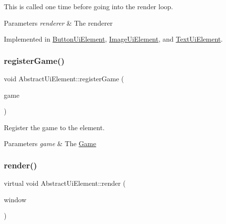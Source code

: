 This is called one time before going into the render loop. 


\begin{DoxyParams}{Parameters}
{\em renderer} & The renderer\\
\hline
\end{DoxyParams}


Implemented in \mbox{\hyperlink{class_button_ui_element_a035c8beddc1ff6d47b94953025f68422}{Button\+Ui\+Element}}, \mbox{\hyperlink{class_image_ui_element_a15c523c82400b74f2f5713c6510f8c7a}{Image\+Ui\+Element}}, and \mbox{\hyperlink{class_text_ui_element_afe15a4085bc4b7c2cf8668cb6d7fd45d}{Text\+Ui\+Element}}.

\mbox{\label{class_abstract_ui_element_aea8a32a77e77f601ca114b8738072079}} 
\subsubsection{\texorpdfstring{register\+Game()}{registerGame()}}
{\footnotesize\ttfamily void Abstract\+Ui\+Element\+::register\+Game (\begin{DoxyParamCaption}\item[{\mbox{\hyperlink{class_abstract_game}{Abstract\+Game}} $\ast$}]{game }\end{DoxyParamCaption})\hspace{0.3cm}{\ttfamily [virtual]}}



Register the game to the element. 


\begin{DoxyParams}{Parameters}
{\em game} & The \mbox{\hyperlink{class_game}{Game}}\\
\hline
\end{DoxyParams}
\mbox{\label{class_abstract_ui_element_aea66ce333323cf2d5e12d4de9515de7b}} 
\subsubsection{\texorpdfstring{render()}{render()}}
{\footnotesize\ttfamily virtual void Abstract\+Ui\+Element\+::render (\begin{DoxyParamCaption}\item[{\mbox{\hyperlink{class_window}{Window}} $\ast$}]{window }\end{DoxyParamCaption})\hspace{0.3cm}{\ttfamily [pure virtual]}}



